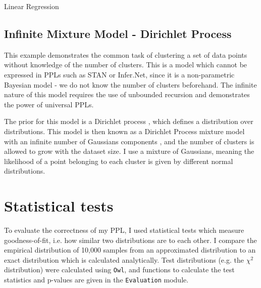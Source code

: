 \begin{listing}[!ht]
	\caption{Linear Regression}
	\label{lst:linreg}
\end{listing}

\subsection{Infinite Mixture Model - Dirichlet Process}
This example demonstrates the common task of clustering a set of data points without knowledge of the number of clusters. This is a model which cannot be expressed in PPLs such as STAN or Infer.Net, since it is a non-parametric Bayesian model - we do not know the number of clusters beforehand. The infinite nature of this model requires the use of unbounded recursion and demonstrates the power of universal PPLs.

The prior for this model is a Dirichlet process \cite{teh2010dirichlet}, which defines a distribution over distributions. This model is then known as a Dirichlet Process mixture model with an infinite number of Gaussians components \cite{dpmm}, and the number of clusters is allowed to grow with the dataset size. I use a mixture of Gaussians, meaning the likelihood of a point belonging to each cluster is given by different normal distributions.

\begin{listing}[H]
\end{listing}




\section{Statistical tests}
To evaluate the correctness of my PPL, I used statistical tests which measure goodness-of-fit, i.e. how similar two distributions are to each other. I compare the empirical distribution of 10,000 samples from an approximated distribution to an exact distribution which is calculated analytically. Test distributions (e.g. the $\chi^2$ distribution) were calculated using \texttt{Owl}, and functions to calculate the test statistics and p-values are given in the \texttt{Evaluation} module.

